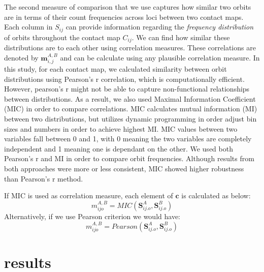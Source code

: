 \documentclass[a4,center,fleqn]{NAR}
\begin{document}
The second measure of comparison that we use captures how 
similar two orbits are in terms of their count 
frequencies across loci between two contact maps. 
Each column in $S_{ij}$ can provide information
regarding the \textit{frequency distribution} of orbits throughout
the contact map $C_{ij}$. 
We can find how similar these distributions are to each other using
correlation measures.
These correlations are denoted by $\mathbf{m}^{\scriptscriptstyle A,B}_{i,j}$ and
can be calculate using
any plausible correlation measure. 
In this study, for each contact map,  we calculated
similarity between orbit distributions using Pearson's r 
correlation, which is computationally efficient.
However, pearson's r might not be able to capture
non-functional relationships between distributions. As a result, we
also used Maximal Information Coefficient (MIC) 
\cite{reshef2011detecting} in order to compare
correlations. MIC calculates mutual information (MI) between two
distributions, but utilizes dynamic programming in order adjust
bin sizes and numbers in order to achieve highest MI.
MIC values between two variables fall between 0 and 1,
with 0 meaning the two variables are completely independent
and 1 meaning one is dependant on the other.
We used both Pearson's r and MI in order to compare orbit
frequencies. Although results from both approaches were more
or less consistent, MIC showed higher robustness than Pearson's 
r method.

If MIC is used as correlation measure, each element of 
 $\mathbf{c}$ is calculated as below:
\begin{equation}
    m^{\scriptscriptstyle A,B}_{ijo} = MIC(\mathbf{S}^A_{ij.o}, \mathbf{S}^B_{ij.o})
    \label{eq:mic}
\end{equation}
Alternatively, if we use Pearson criterion we would have:
\begin{equation}
    m^{\scriptscriptstyle A,B}_{ijo} = Pearson(\mathbf{S}^A_{ij.o}, \mathbf{S}^B_{ij.o})
    \label{eq:pearson}
\end{equation}

\section{results}
\end{document}
